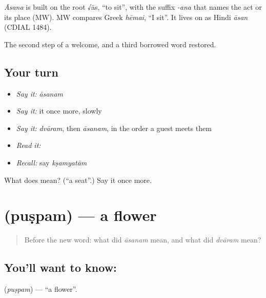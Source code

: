 \begin{cousinweb}
\emph{Āsana} is built on the root √ās, \textquotedblleft{}to sit\textquotedblright{}, with the suffix \emph{-ana} that names the act or its place (MW). MW compares Greek \emph{hēmai}, \textquotedblleft{}I sit\textquotedblright{}. It lives on as Hindi \emph{āsan} (CDIAL 1484).
\end{cousinweb}

\begin{grammarlens}[title={What you've built}]
The second step of a welcome, and a third borrowed word restored.
\end{grammarlens}

\subsection*{Your turn}
\begin{itemize}
\raggedright
  \item \emph{Say it:} \emph{āsanam}
  \item \emph{Say it:} it once more, slowly
  \item \emph{Say it:} \emph{dvāram}, then \emph{āsanam}, in the order a guest meets them
  \item \emph{Read it:} \textbf{}
  \item \emph{Recall:} say \emph{kṣamyatām}
\end{itemize}

\begin{tcolorbox}[breakable,colback=teal!4,colframe=teal!35!black,title={Before you move on}]
What does  mean? (\textquotedblleft{}a seat\textquotedblright{}.) Say it once more.
\end{tcolorbox}
\section[\texorpdfstring{\sk{पुष्पम्} (puṣpam)}{पुष्पम् (puṣpam)}]{ (puṣpam) — a flower}

\label{lesson:SA-C30-flower}



\begin{quote}
Before the new word: what did \emph{āsanam} mean, and what did \emph{dvāram} mean?
\end{quote}

\subsection*{You'll want to know: }
\textbf{} (\emph{puṣpam}) — \textquotedblleft{}a flower\textquotedblright{}.

